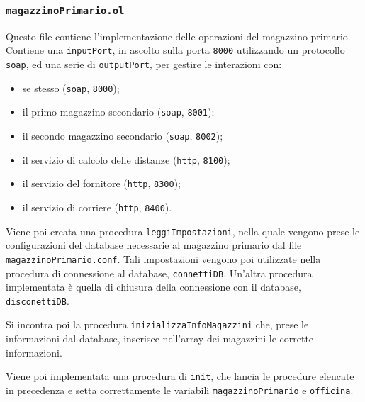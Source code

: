 \subsubsection*{\tt magazzinoPrimario.ol}
Questo file contiene l'implementazione delle operazioni del magazzino
primario. Contiene una {\tt inputPort}, in ascolto sulla porta {\tt 8000}
utilizzando un protocollo {\tt soap}, ed una serie di {\tt outputPort},
per gestire le interazioni con:
\begin{itemize}
  \item se stesso ({\tt soap}, {\tt 8000});
  \item il primo magazzino secondario ({\tt soap}, {\tt 8001});
  \item il secondo magazzino secondario ({\tt soap}, {\tt 8002});
  \item il servizio di calcolo delle distanze ({\tt http}, {\tt 8100});
  \item il servizio del fornitore ({\tt http}, {\tt 8300});
  \item il servizio di corriere ({\tt http}, {\tt 8400}).
\end{itemize}
Viene poi creata una procedura {\tt leggiImpostazioni}, nella quale
vengono prese le configurazioni del database necessarie al magazzino
primario dal file {\tt magazzinoPrimario.conf}. Tali impostazioni
vengono poi utilizzate nella procedura di connessione al database,
{\tt connettiDB}. Un'altra procedura implementata \`e quella di chiusura
della connessione con il database, {\tt disconettiDB}.

Si incontra poi la procedura {\tt inizializzaInfoMagazzini} che, prese
le informazioni dal database, inserisce nell'array dei magazzini le
corrette informazioni.

Viene poi implementata una procedura di {\tt init}, che lancia le
procedure elencate in precedenza e setta correttamente le variabili
{\tt magazzinoPrimario} e {\tt officina}.

